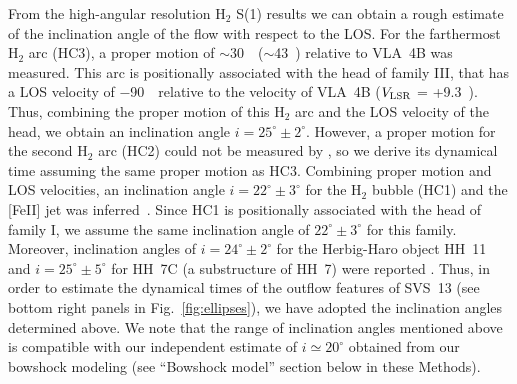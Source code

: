 \documentclass[12pt]{mythesis}
\begin{document}
From the high-angular resolution H$_2$ S(1) results\citep{hodapp2014} we can obtain a rough estimate of the inclination angle of the flow with respect to the LOS. For the farthermost H$_2$ arc (HC3), a proper motion of $\sim$30~\masyr\ ($\sim$43~\kms) relative to VLA~4B was measured\citep{hodapp2014}. This arc is positionally associated with the head of family III, that has a LOS velocity of $-$90~\kms\ relative to the velocity of VLA~4B ($V_{\rm LSR}$ = +9.3~\kms)\citep{diaz-rodriguez2022}. Thus, combining
the proper motion of this H$_2$ arc and the LOS velocity of the head, we obtain an inclination angle $i=25^\circ\pm2^\circ$. However, a proper motion for the second H$_2$ arc (HC2) could not be measured by \citet{hodapp2014}, so we derive its dynamical time assuming the same proper motion as HC3. Combining proper motion and LOS velocities, an inclination angle $i=22^\circ\pm3^\circ$ for the H$_2$ bubble (HC1) and the [FeII] jet was inferred~\citep{hodapp2014}. Since HC1 is positionally associated with the head of family I, we assume the same inclination angle of $22^\circ\pm3^\circ$ for this family. Moreover, inclination angles of $i=24^\circ\pm2^\circ$ for the Herbig-Haro object HH~11 and $i=25^\circ\pm5^\circ$ for HH~7C (a substructure of HH~7) were reported \citep{hartigan2019}. Thus, in order to estimate the dynamical times of the outflow features of SVS~13 (see bottom right panels in Fig.~\ref{fig:ellipses}), we have adopted the inclination angles determined 
above.
We note that the range of inclination angles mentioned above is compatible with our independent estimate of $i\simeq20^\circ$ obtained from our bowshock modeling (see ``Bowshock model'' section below in these Methods).



\end{document}
